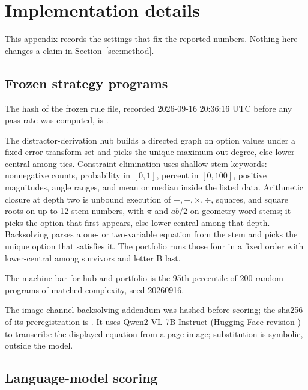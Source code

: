 \section{Implementation details}
\label{app:implementation}

This appendix records the settings that fix the reported numbers. Nothing here changes a claim in Section~\ref{sec:method}.

\subsection{Frozen strategy programs}
\label{app:strategies}

The hash of the frozen rule file, recorded 2026-09-16 20:36:16 UTC before any pass rate was computed, is
.

The distractor-derivation hub builds a directed graph on option values under a fixed error-transform set and picks the unique maximum out-degree, else lower-central among ties. Constraint elimination uses shallow stem keywords: nonnegative counts, probability in $[0,1]$, percent in $[0,100]$, positive magnitudes, angle ranges, and mean or median inside the listed data. Arithmetic closure at depth two is unbound execution of $+,-,\times,\div$, squares, and square roots on up to 12 stem numbers, with $\pi$ and $ab/2$ on geometry-word stems; it picks the option that first appears, else lower-central among that depth. Backsolving parses a one- or two-variable equation from the stem and picks the unique option that satisfies it. The portfolio runs those four in a fixed order with lower-central among survivors and letter B last.

The machine bar for hub and portfolio is the 95th percentile of 200 random programs of matched complexity, seed 20260916.

The image-channel backsolving addendum was hashed before scoring; the sha256 of its preregistration is
.
It uses Qwen2-VL-7B-Instruct (Hugging Face revision ) to transcribe the displayed equation from a page image; substitution is symbolic, outside the model.

\subsection{Language-model scoring}
\label{app:lm}

